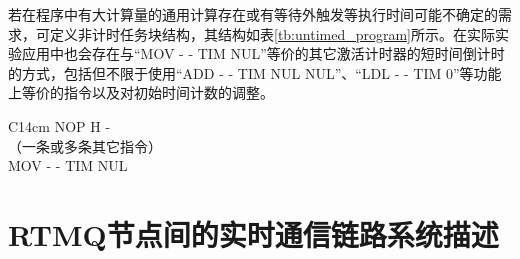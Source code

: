 
若在程序中有大计算量的通用计算存在或有等待外触发等执行时间可能不确定的需求，可定义非计时任务块结构，其结构如表\ref{tb:untimed_program}所示。在实际实验应用中也会存在与“MOV - - TIM NUL”等价的其它激活计时器的短时间倒计时的方式，包括但不限于使用“ADD - - TIM NUL NUL”、“LDL - - TIM 0”等功能上等价的指令以及对初始时间计数的调整。

\begin{table}
    \centering
    \caption[非计时任务块结构]{非计时任务块结构\label{tb:untimed_program}}
    \begin{tabular}{C{14cm}}
        \toprule
        NOP H -\\
        （一条或多条其它指令）\\
        MOV - - TIM NUL \\
        \bottomrule
    \end{tabular}
\end{table}










\newpage
\section[RTMQ节点间的实时通信链路系统描述]{RTMQ节点间的实时通信链路系统描述\label{section:rtmq_links}}

